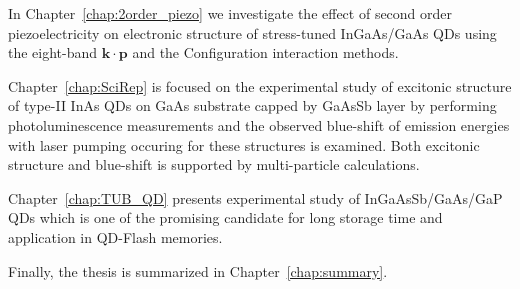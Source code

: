 \documentclass[
a4paper, %
11pt, %
onecolumn, %
openany, %
oldfontcommands,
]{memoir}
\begin{document}
In Chapter~\ref{chap:2order_piezo} we investigate the effect of second order piezoelectricity on electronic %
structure of stress-tuned InGaAs/GaAs QDs using the eight-band $\mathbf{k \cdot p}$ and the Configuration interaction methods.

Chapter~\ref{chap:SciRep} is focused on the experimental study of excitonic structure of type-II InAs QDs on GaAs substrate capped by GaAsSb layer by performing photoluminescence measurements and the observed blue-shift of emission energies with laser pumping occuring for these structures is examined. Both excitonic structure and blue-shift is supported by multi-particle calculations.

Chapter~\ref{chap:TUB_QD} presents experimental study of InGaAsSb/GaAs/GaP QDs which is one of the promising candidate for long storage time and application in QD-Flash memories.  

Finally, the thesis is summarized in Chapter~\ref{chap:summary}.
\newpage 




\mainmatter

%






\appendix













\backmatter



%
%
%


\end{document}

